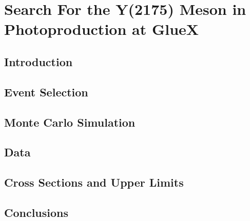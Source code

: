 \section{Search For the Y(2175) Meson in Photoproduction at GlueX}
\label{p4}

\subsection{Introduction}

\subsection{Event Selection}



\subsection{Monte Carlo Simulation}

\subsection{Data}

\subsection{Cross Sections and Upper Limits}

\subsection{Conclusions}
